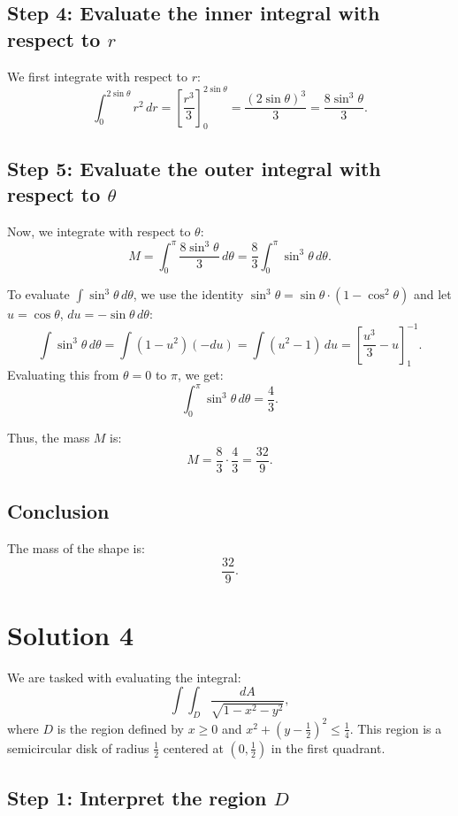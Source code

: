 \documentclass[11pt]{article}
\begin{document}
\subsection{Step 4: Evaluate the inner integral with respect to \( r \)}

We first integrate with respect to \( r \):
\[
\int_{0}^{2 \sin \theta} r^2 \, dr = \left[ \frac{r^3}{3} \right]_{0}^{2 \sin \theta} = \frac{(2 \sin \theta)^3}{3} = \frac{8 \sin^3 \theta}{3}.
\]
\newpage

\subsection{Step 5: Evaluate the outer integral with respect to \( \theta \)}

Now, we integrate with respect to \( \theta \):
\[
M = \int_{0}^{\pi} \frac{8 \sin^3 \theta}{3} \, d\theta = \frac{8}{3} \int_{0}^{\pi} \sin^3 \theta \, d\theta.
\]

To evaluate \( \int \sin^3 \theta \, d\theta \), we use the identity \( \sin^3 \theta = \sin \theta \cdot (1 - \cos^2 \theta) \) and let \( u = \cos \theta \), \( du = -\sin \theta \, d\theta \):
\[
\int \sin^3 \theta \, d\theta = \int (1 - u^2)(-du) = \int (u^2 - 1) \, du = \left[ \frac{u^3}{3} - u \right]_{1}^{-1}.
\]
Evaluating this from \( \theta = 0 \) to \( \pi \), we get:
\[
\int_{0}^{\pi} \sin^3 \theta \, d\theta = \frac{4}{3}.
\]

Thus, the mass \( M \) is:
\[
M = \frac{8}{3} \cdot \frac{4}{3} = \frac{32}{9}.
\]
\newpage

\subsection{Conclusion}

The mass of the shape is:
\[
\boxed{\frac{32}{9}}.
\]

\newpage
\section{Solution 4}




We are tasked with evaluating the integral:
\[
\int \int_{D} \frac{dA}{\sqrt{1 - x^2 - y^2}},
\]
where \( D \) is the region defined by \( x \geq 0 \) and \( x^2 + (y - \frac{1}{2})^2 \leq \frac{1}{4} \). This region is a semicircular disk of radius \( \frac{1}{2} \) centered at \( (0, \frac{1}{2}) \) in the first quadrant.
\newpage

\subsection{Step 1: Interpret the region \( D \)}
\end{document}
